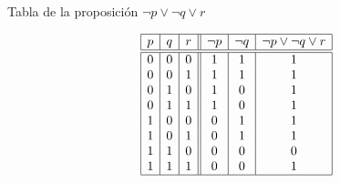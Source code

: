 \begin{table}%
  \caption{Tabla de la proposición $\neg p \lor \neg q \lor r$}
  \label{tbl:ej-clausulada-2}
  \centering
  $$
    \begin{array}{|c|c|c||c|c|c|}
      \hline
      p & q & r & \neg p & \neg q & \neg p \lor \neg q \lor r \\
      \hline
      \hline
      0 & 0 & 0   & 1 & 1 & 1 \\
      0 & 0 & 1   & 1 & 1 & 1 \\
      0 & 1 & 0   & 1 & 0 & 1 \\
      0 & 1 & 1   & 1 & 0 & 1 \\
      1 & 0 & 0   & 0 & 1 & 1 \\
      1 & 0 & 1   & 0 & 1 & 1 \\
      1 & 1 & 0   & 0 & 0 & 0 \\
      1 & 1 & 1   & 0 & 0 & 1 \\
      \hline
    \end{array}
  $$
\end{table}













